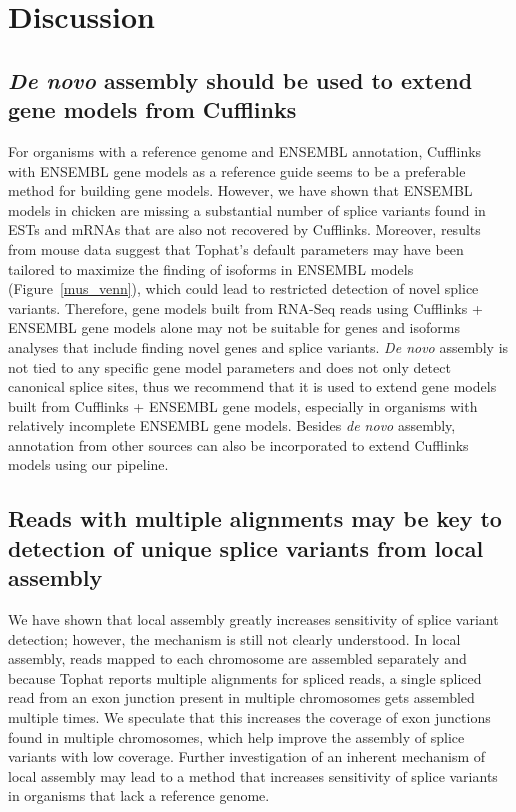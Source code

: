 \documentclass[10pt]{article}
\begin{document}
\section*{Discussion}

\subsection*{{\em De novo} assembly should be used to extend gene models from
Cufflinks}
For organisms with a reference genome and ENSEMBL annotation, Cufflinks with
ENSEMBL gene models as a reference guide seems to be a preferable method for
building gene models. However, we have shown that ENSEMBL models in chicken are
missing a substantial number of splice variants found in ESTs and mRNAs that
are also not recovered by Cufflinks. Moreover, results from mouse data suggest
that Tophat's default parameters may have been tailored to maximize the finding
of isoforms in ENSEMBL models (Figure~\ref{mus_venn}), which could lead to
restricted detection of novel splice variants.
Therefore, gene models built from RNA-Seq reads using Cufflinks + ENSEMBL gene
models alone may not be suitable for genes and isoforms analyses that include
finding novel genes and splice variants.  {\em De novo} assembly is not tied to
any specific gene model parameters and does not only detect canonical splice
sites, thus we recommend that it is used to extend gene models built from
Cufflinks + ENSEMBL gene models, especially in organisms with relatively
incomplete ENSEMBL gene models.  Besides {\em de novo} assembly,
annotation from other sources can also be incorporated to extend Cufflinks models
using our pipeline.


\subsection*{Reads with multiple alignments may be key to detection of unique
splice variants from local assembly}
We have shown that local assembly greatly increases sensitivity of splice
variant detection; however, the mechanism is still not clearly understood.  In
local assembly, reads mapped to each chromosome are assembled separately and
because Tophat reports multiple alignments for spliced reads, a single spliced
read from an exon junction present in multiple chromosomes gets assembled
multiple times. We speculate that this increases the coverage of exon junctions
found in multiple chromosomes, which help improve the assembly of splice
variants with low coverage. Further investigation of an inherent mechanism of
local assembly may lead to a method that increases sensitivity of splice
variants in organisms that lack a reference genome.
\end{document}
